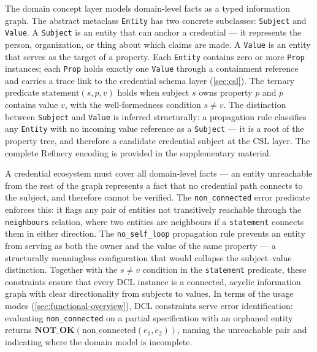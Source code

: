The domain concept layer models domain-level facts as a typed information graph. The abstract metaclass \texttt{Entity} has two concrete subclasses: \texttt{Subject} and \texttt{Value}. A \texttt{Subject} is an entity that can anchor a credential --- it represents the person, organization, or thing about which claims are made. A \texttt{Value} is an entity that serves as the target of a property. Each \texttt{Entity} contains zero or more \texttt{Prop} instances; each \texttt{Prop} holds exactly one \texttt{Value} through a containment reference and carries a trace link to the credential schema layer (\autoref{sec:csl}). The ternary predicate \(\text{statement}(s, p, v)\) holds when subject \(s\) owns property \(p\) and \(p\) contains value \(v\), with the well-formedness condition \(s \neq v\). The distinction between \texttt{Subject} and \texttt{Value} is inferred structurally: a propagation rule classifies any \texttt{Entity} with no incoming value reference as a \texttt{Subject} --- it is a root of the property tree, and therefore a candidate credential subject at the CSL layer. The complete Refinery encoding is provided in the supplementary material.


A credential ecosystem must cover all domain-level facts --- an entity unreachable from the rest of the graph represents a fact that no credential path connects to the subject, and therefore cannot be verified. The \texttt{non\_connected} error predicate enforces this: it flags any pair of entities not transitively reachable through the \texttt{neighbours} relation, where two entities are neighbours if a \texttt{statement} connects them in either direction. The \texttt{no\_self\_loop} propagation rule prevents an entity from serving as both the owner and the value of the same property --- a structurally meaningless configuration that would collapse the subject--value distinction. Together with the \(s \neq v\) condition in the \texttt{statement} predicate, these constraints ensure that every DCL instance is a connected, acyclic information graph with clear directionality from subjects to values.  In terms of the usage modes (\autoref{sec:functional-overview}), DCL constraints serve error identification: evaluating \texttt{non\_connected} on a partial specification with an orphaned entity returns \(\textbf{NOT\_OK}(\text{non\_connected}(e_1, e_2))\), naming the unreachable pair and indicating where the domain model is incomplete.

